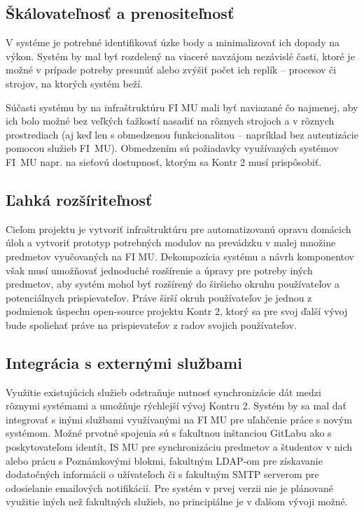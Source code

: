 \documentclass[
  digital, %
  twoside, %
  table,   %
  lof,     %
  lot,     %
]{fithesis3}
\begin{document}
\subsection{Škálovateľnosť a prenositeľnosť}

V systéme je potrebné identifikovať úzke body a minimalizovať ich dopady na výkon. Systém by mal byť rozdelený na viaceré navzájom nezávislé časti, ktoré je možné v prípade potreby presunúť alebo zvýšiť počet ich replík -- procesov či strojov, na ktorých systém beží. 

Súčasti systému by na infraštruktúru FI MU mali byť naviazané čo najmenej, aby ich bolo možné bez veľkých ťažkostí nasadiť na rôznych strojoch a v rôznych prostrediach (aj keď len s obmedzenou funkcionalitou -- napríklad bez autentizácie pomocou služieb FI~MU). Obmedzením sú požiadavky využívaných systémov FI~MU napr. na sieťovú dostupnosť, ktorým sa Kontr 2 musí prispôsobiť.

\subsection{Ľahká rozšíriteľnosť}

Cieľom projektu je vytvoriť infraštruktúru pre automatizovanú opravu domácich úloh a vytvoriť prototyp potrebných modulov na prevádzku v malej množine predmetov vyučovaných na FI MU. Dekompozícia systému a návrh komponentov však musí umožňovať jednoduché rozšírenie a úpravy pre potreby iných predmetov, aby systém mohol byť rozšírený do širšieho okruhu používateľov a potenciálnych prispievateľov. Práve širší okruh používateľov je jednou z podmienok úspechu open-source projektu Kontr 2, ktorý sa pre svoj ďalší vývoj bude spoliehať práve na prispievateľov z radov svojich používateľov.

\subsection{Integrácia s externými službami}
Využitie existujúcich služieb odstraňuje nutnosť synchronizácie dát medzi rôznymi systémami a umožňuje rýchlejší vývoj Kontru 2. Systém by sa mal dať integrovať s inými službami využívanými na FI MU pre uľahčenie práce s novým systémom. Možné prvotné spojenia sú s fakultnou inštanciou GitLabu ako s poskytovateľom identít, IS MU pre synchronizáciu predmetov a študentov v nich alebo prácu s Poznámkovými blokmi, fakultným LDAP-om pre získavanie dodatočných informácii o užívateľoch či s fakultným SMTP serverom pre odosielanie emailových notifikácií. Pre systém v prvej verzii nie je plánované využitie iných než fakultných služieb, no principiálne je v ďalšom vývoji možné.
\end{document}
